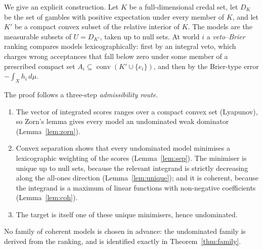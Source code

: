 \documentclass[11pt]{article}
\DeclareMathOperator{\conv}{conv}
\theoremstyle{plain}
\theoremstyle{definition}
\theoremstyle{remark}
\begin{document}
We give an explicit construction. Let $K$ be a full-dimensional credal set, let $D_K$ be
the set of gambles with positive expectation under every member of $K$, and let $K'$ be a
compact convex subset of the relative interior of $K$. The models are the measurable
subsets of $U=D_{K'}$, taken up to null sets. At world $i$ a \emph{veto--Brier} ranking
compares models lexicographically: first by an integral veto, which charges wrong
acceptances that fall below zero under some member of a prescribed compact set
$A_i\subseteq\conv(K'\cup\{e_i\})$, and then by the Brier-type error $-\int_X h_i\,d\mu$.

The proof follows a three-step \emph{admissibility route}.
\begin{enumerate}
  \item The vector of integrated scores ranges over a compact convex set (Lyapunov), so
  Zorn's lemma gives every model an undominated weak dominator
  (Lemma~\ref{lem:zorn}).
  \item Convex separation shows that every undominated model minimises a lexicographic
  weighting of the scores (Lemma~\ref{lem:sep}). The minimiser is unique up to null sets,
  because the relevant integrand is strictly decreasing along the all-ones direction
  (Lemma~\ref{lem:unique}); and it is coherent, because the integrand is a maximum of
  linear functions with non-negative coefficients (Lemma~\ref{lem:coh}).
  \item The target is itself one of these unique minimisers, hence undominated.
\end{enumerate}
No family of coherent models is chosen in advance: the undominated family is derived from
the ranking, and is identified exactly in Theorem~\ref{thm:family}.
\end{document}
